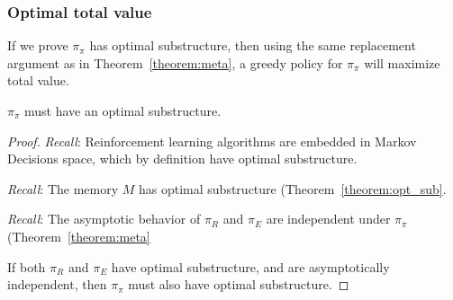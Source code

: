 \subsubsection*{Optimal total value}
If we prove $\pi_{\pi}$ has optimal substructure, then using the same replacement argument \cite{Roughgarden2019} as in Theorem~\ref{theorem:meta}, a greedy policy for $\pi_\pi$ will maximize total value.

\begin{theorem} \label{theorem:meta_total} 
    $\pi_\pi$ must have an optimal substructure. 
\end{theorem}
\begin{proof}
    \textit{Recall}: Reinforcement learning algorithms are embedded in Markov Decisions space, which by definition have optimal substructure.
    
    \textit{Recall}: The memory $M$ has optimal substructure (Theorem~\ref{theorem:opt_sub}.
    
    \textit{Recall}: The asymptotic behavior of $\pi_R$ and $\pi_E$ are independent under $\pi_\pi$ (Theorem~\ref{theorem:meta}
	
	If both $\pi_R$ and $\pi_E$ have optimal substructure, and are asymptotically independent, then $\pi_\pi$ must also have optimal substructure. 
\end{proof}
